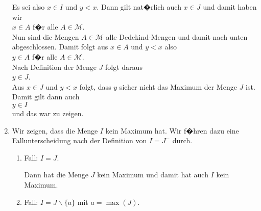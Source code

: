 \begin{enumerate}
      Es sei also $x \in I$ und $y < x$.  Dann gilt nat�rlich auch $x \in J$ und damit haben wir
      \\[0.2cm]
      \hspace*{1.3cm}
      $x \in A$ \quad f�r alle $A \in \mathcal{M}$.
      \\[0.2cm]
      Nun sind die Mengen $A \in \mathcal{M}$ alle Dedekind-Mengen und damit nach unten abgeschlossen.
      Damit folgt aus $x \in A$ und $y < x$ also
      \\[0.2cm]
      \hspace*{1.3cm}
      $y \in A$ \quad f�r alle $A \in \mathcal{M}$.      
      \\[0.2cm]
      Nach Definition der Menge $J$ folgt daraus 
      \\[0.2cm]
      \hspace*{1.3cm}
      $y \in J$.
      \\[0.2cm]
      Aus $x \in J$ und $y < x$ folgt, dass $y$ sicher nicht das Maximum der Menge $J$ ist.  Damit gilt
      dann auch
      \\[0.2cm]
      \hspace*{1.3cm}
      $y \in I$
      \\[0.2cm]
      und das war zu zeigen.
\item Wir zeigen, dass die Menge $I$ kein Maximum hat.
      Wir f�hren dazu eine Fallunterscheidung nach der Definition von $I = J^-$ durch.
      \begin{enumerate}
      \item Fall: $I = J$.

            Dann hat die Menge $J$ kein Maximum und damit hat auch $I$ kein Maximum.
      \item Fall: $I = J \backslash \{ a \}$ mit $a = \max(J)$.
            

\end{enumerate}
\end{enumerate}
